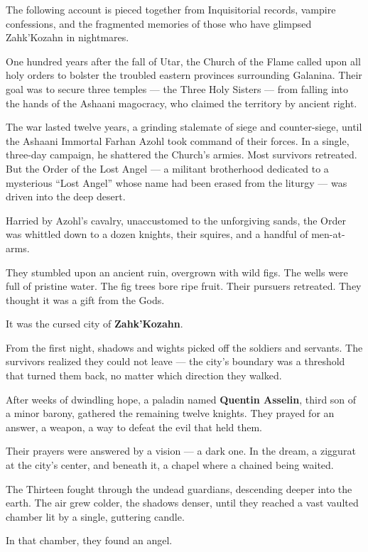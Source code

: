 \documentclass[10pt,twoside]{book}
\begin{document}
The following account is pieced together from Inquisitorial records, vampire confessions, and the fragmented memories of those who have glimpsed Zahk'Kozahn in nightmares.

One hundred years after the fall of Utar, the Church of the Flame called upon all holy orders to bolster the troubled eastern provinces surrounding Galanina. Their goal was to secure three temples --- the Three Holy Sisters --- from falling into the hands of the Ashaani magocracy, who claimed the territory by ancient right.

The war lasted twelve years, a grinding stalemate of siege and counter-siege, until the Ashaani Immortal Farhan Azohl took command of their forces. In a single, three-day campaign, he shattered the Church's armies. Most survivors retreated. But the Order of the Lost Angel --- a militant brotherhood dedicated to a mysterious ``Lost Angel'' whose name had been erased from the liturgy --- was driven into the deep desert.

Harried by Azohl's cavalry, unaccustomed to the unforgiving sands, the Order was whittled down to a dozen knights, their squires, and a handful of men-at-arms.

They stumbled upon an ancient ruin, overgrown with wild figs. The wells were full of pristine water. The fig trees bore ripe fruit. Their pursuers retreated. They thought it was a gift from the Gods.

It was the cursed city of \textbf{Zahk'Kozahn}.

From the first night, shadows and wights picked off the soldiers and servants. The survivors realized they could not leave --- the city's boundary was a threshold that turned them back, no matter which direction they walked.

After weeks of dwindling hope, a paladin named \textbf{Quentin Asselin}, third son of a minor barony, gathered the remaining twelve knights. They prayed for an answer, a weapon, a way to defeat the evil that held them.

Their prayers were answered by a vision --- a dark one. In the dream, a ziggurat at the city's center, and beneath it, a chapel where a chained being waited.

The Thirteen fought through the undead guardians, descending deeper into the earth. The air grew colder, the shadows denser, until they reached a vast vaulted chamber lit by a single, guttering candle.

In that chamber, they found an angel.
\end{document}
